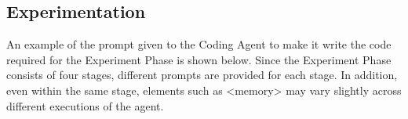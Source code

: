 \subsection{Experimentation}
\label{appendix:experimentation}
An example of the prompt given to the Coding Agent to make it write the code required for the Experiment Phase is shown below.
Since the Experiment Phase consists of four stages, different prompts are provided for each stage.
In addition, even within the same stage, elements such as <memory> may vary slightly across different executions of the agent.

